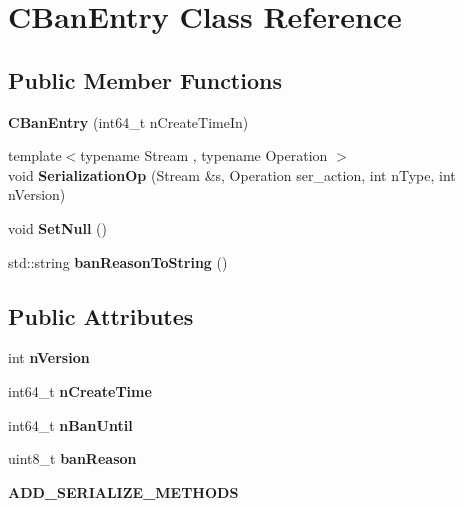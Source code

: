 \hypertarget{class_c_ban_entry}{}\section{C\+Ban\+Entry Class Reference}
\label{class_c_ban_entry}
\subsection*{Public Member Functions}
\begin{DoxyCompactItemize}
\item 
\mbox{\label{class_c_ban_entry_a6b787cdf29a5ce8688845e15f5153a64}} 
{\bfseries C\+Ban\+Entry} (int64\+\_\+t n\+Create\+Time\+In)
\item 
\mbox{\label{class_c_ban_entry_aba9cee585ab7313f54a9397e6c449732}} 
{\footnotesize template$<$typename Stream , typename Operation $>$ }\\void {\bfseries Serialization\+Op} (Stream \&s, Operation ser\+\_\+action, int n\+Type, int n\+Version)
\item 
\mbox{\label{class_c_ban_entry_a7c2cd7c6ef6a7507c384697e46a23b2e}} 
void {\bfseries Set\+Null} ()
\item 
\mbox{\label{class_c_ban_entry_ada434bfaaa0ba57a7ad4c62cf5cbcda5}} 
std\+::string {\bfseries ban\+Reason\+To\+String} ()
\end{DoxyCompactItemize}
\subsection*{Public Attributes}
\begin{DoxyCompactItemize}
\item 
\mbox{\label{class_c_ban_entry_acfe8c22d99805d72b0144cbb525a58f1}} 
int {\bfseries n\+Version}
\item 
\mbox{\label{class_c_ban_entry_a646408bd4046c05a14fb4aa8fbc1541a}} 
int64\+\_\+t {\bfseries n\+Create\+Time}
\item 
\mbox{\label{class_c_ban_entry_ad055d0792f71b5da238c668ef0a27109}} 
int64\+\_\+t {\bfseries n\+Ban\+Until}
\item 
\mbox{\label{class_c_ban_entry_a70899703ea4dcfe6056f4db8b7f77126}} 
uint8\+\_\+t {\bfseries ban\+Reason}
\item 
\mbox{\label{class_c_ban_entry_a1bcaf68df27f2c194d91fb56630ed6ac}} 
{\bfseries A\+D\+D\+\_\+\+S\+E\+R\+I\+A\+L\+I\+Z\+E\+\_\+\+M\+E\+T\+H\+O\+DS}
\end{DoxyCompactItemize}
